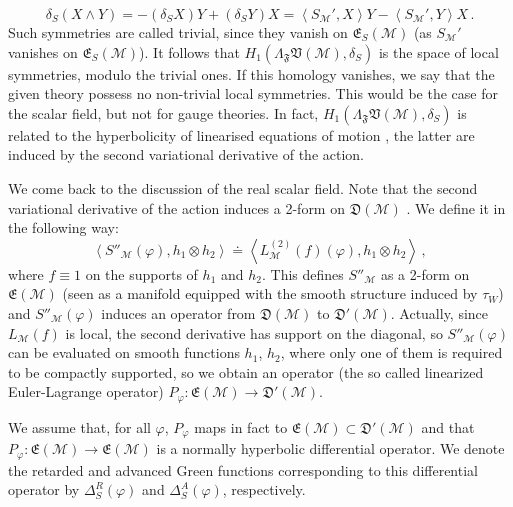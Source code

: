 \documentclass[12pt]{article}
\newcommand{\E}{\mathfrak{E}}
\newcommand{\V}{\mathfrak{V}}
\newcommand{\D}{\mathfrak{D}}
\newcommand{\F}{\mathfrak{F}}
\newcommand{\Mcal}{\mathcal{M}}
\newcommand{\La}{\Lambda}
\newcommand{\ph}{\varphi}
\newcommand{\1}{\mathds{1}}                         %
\begin{document}
{\[\delta_S(X\wedge Y)=-(\delta_SX) Y+(\delta_S Y)X=\left<S_{\mathcal{M}}',X\right>Y-\left<S_{\mathcal{M}}',Y\right>X\,.\]
Such symmetries are called trivial, since they vanish on $\E_S(\Mcal)$ (as $S_{\mathcal{M}}'$ vanishes on $\mathfrak{E}_S(\mathcal{M})$). It follows that $H_1(\La_{\F}\V(\Mcal),\delta_S)$ is the space of local symmetries, modulo the trivial ones. If this homology vanishes, we say that the given theory possess no non-trivial local symmetries. This would be the case for the scalar field, but not for gauge theories. In fact, $H_1(\La_{\F}\V(\Mcal),\delta_S)$ is related to the hyperbolicity of linearised equations of motion \cite{FR}, the latter are induced by the second variational derivative of the action.

We come back to the discussion of the real scalar field. Note that the second variational derivative of the action induces a 2-form on $\D(\Mcal)$ . We define it in the following way:
\[
\left<S''_\Mcal(\ph),h_1\otimes h_2\right>\doteq \left<L^{(2)}_\Mcal(f)(\ph),h_1\otimes h_2\right>\,,
\]
where $f\equiv 1$ on the supports of $h_1$ and $h_2$. This defines $S''_\Mcal$ as a 2-form on $\E(\Mcal)$ (seen as a manifold equipped with the smooth structure induced by $\tau_W$) and $S''_\Mcal(\ph)$ induces an operator from $\D(\Mcal)$ to $\D'(\Mcal)$.
Actually, since $L_\Mcal(f)$ is local, the second derivative has support on the diagonal, so $S''_\Mcal(\ph)$ 
can be evaluated on smooth functions $h_1$, $h_2$, where only one of them is required to be compactly supported, so we obtain an operator (the so called linearized Euler-Lagrange operator) $P_{\varphi}:\E(\Mcal)\rightarrow \D'(\Mcal)$. 

We assume that, for all $\ph$, $P_{\varphi}$ maps in fact to $\E(\Mcal)\subset\D'(\Mcal)$ and that $P_{\varphi}:\E(\Mcal)\rightarrow \E(\Mcal)$ is a normally hyperbolic differential operator. We denote the retarded and advanced Green functions corresponding to this differential operator by $\Delta_S^R(\ph)$ and $\Delta_S^A(\ph)$, respectively. 
}
\end{document}
